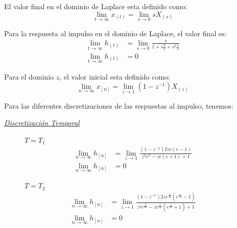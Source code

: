 \documentclass[a4paper,12pt]{report}
\begin{document}
\begin{enumerate}[label=\alph*), left=0pt]
                El valor final en el dominio de Laplace esta definido como:
                \begin{equation}
                    \label{tvf.laplace}
                    \lim_{t \to \infty} x_{(t)} = \lim_{s \to 0} s X_{(s)}
                \end{equation}

                Para la respuesta al impulso en el dominio de Laplace, el valor final es:
                \begin{align*}
                    \lim_{t \to \infty} h_{(t)} &= \lim_{s \to 0} \frac{s}{1 + s \frac{3}{2} + s^2 \frac{1}{2}}\\
                    \lim_{t \to \infty} h_{(t)} &= 0
                \end{align*}

                Para el dominio $z$, el valor inicial esta definido como:
                \begin{equation}
                    \label{tvf.zeta}
                    \lim_{n \to \infty} x_{[n]} = \lim_{z \to 1} \left(1 - z^{-1}\right) X_{(z)}
                \end{equation}

                Para las diferentes discretizaciones de las respuestas al impulso, tenemos:

                {\centering\underline{\textit{Discretización Temporal}}\par}
                \begin{figure}[h!]
                    \centering
                    \begin{minipage}{0.4\textwidth}
                        \centering
                        $T = T_1$
                        \begin{align*}
                            \lim_{n \to \infty} h_{[n]} &= \lim_{z \to 1}  \frac{\left(1 - z^{-1}\right) 2 z e (e - 1)}
                                {z^2 e^3 - z e (e + 1) + 1}\\
                            \lim_{n \to \infty} h_{[n]} &= 0
                        \end{align*}
                    \end{minipage}
                    \hspace{0.5cm}
                    \begin{minipage}{0.4\textwidth}
                        \centering
                        $T = T_2$
                        \begin{align*}
                            \lim_{n \to \infty} h_{[n]} &= \lim_{z \to 1} \frac{\left(1 - z^{-1}\right) 2 z e^{\frac{1}
                                {10}} (e^{\frac{1}{10}} - 1)}{z^2 e^{\frac{3}{10}} - z  e^{\frac{1}{10}}(e^{
                                \frac{1}{10}} + 1) + 1}\\
                            \lim_{n \to \infty} h_{[n]} &= 0
                        \end{align*}
                    \end{minipage}
                \end{figure}


\end{enumerate}
\end{document}
